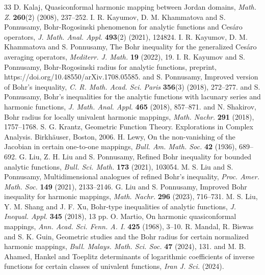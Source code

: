 \documentclass[11pt,reqno]{amsart}
\newtheorem{open problem}{Open problem}[section]
\numberwithin{equation}{section}
\begin{document}
\begin{thebibliography}{33}
 {\sc D. Kalaj}, Quasiconformal harmonic mapping between Jordan domains, {\it Math. Z.} {\bf260}(2) (2008), 237--252.
  {\sc I. R. Kayumov, D. M. Khammatova} and {\sc S. Ponnusamy}, Bohr-Rogosinski phenomenon for analytic functions and Ces\'aro operators, {\it J. Math. Anal. Appl.} {\bf 493}(2) (2021), 124824. 
  {\sc I. R. Kayumov, D. M. Khammatova} and {\sc S. Ponnusamy}, The Bohr inequality for the generalized Ces\'aro averaging operators, {\it Mediterr. J. Math.} {\bf 19} (2022), 19. 
  {\sc I. R. Kayumov} and {\sc S. Ponnusamy}, Bohr-Rogosinski radius for analytic functions, preprint, https://doi.org/10.48550/arXiv.1708.05585.
 and {\sc S. Ponnusamy}, Improved version of Bohr's inequality, {\it C. R. Math. Acad. Sci. Paris} {\bf356}(3) (2018), 272--277.
 and {\sc S. Ponnusamy}, Bohr's inequalities for the analytic functions with lacunary series and harmonic functions, {\it J. Math. Anal. Appl.} {\bf465} (2018), 857--871.
 and {\sc N. Shakirov}, Bohr radius for locally univalent harmonic mappings, {\it Math. Nachr.} {\bf291} (2018), 1757--1768.
 {\sc S. G. Krantz}, Geometric Function Theory. Explorations in Complex Analysis. Birkh\"auser, Boston, 2006.
 {\sc H. Lewy}, On the non-vanishing of the Jacobian in certain one-to-one mappings, {\it Bull. Am. Math. Soc.} {\bf42} (1936), 689--692.
 {\sc G. Liu, Z. H.  Liu} and {\sc S. Ponnusamy}, Refined Bohr inequality for bounded analytic functions, {\it Bull. Sci. Math.} {\bf173} (2021), 103054.
 {\sc M. S. Liu} and {\sc S. Ponnusamy}, Multidimensional analogues of refined Bohr's inequality, {\it Proc. Amer. Math. Soc.} {\bf149} (2021), 2133--2146.
 {\sc G. Liu} and {\sc S. Ponnusamy}, Improved Bohr inequality for harmonic mappings, {\it Math. Nachr.} {\bf296} (2023), 716--731.
 {\sc M. S. Liu, Y. M. Shang} and {\sc J. F. Xu}, Bohr-type inequalities of analytic functions, {\it J. Inequal. Appl.} {\bf345} (2018), 13 pp.
 {\sc O. Martio}, On harmonic quasiconformal mappings, {\it Ann. Acad. Sci. Fenn. A. I.} {\bf425} (1968), 3--10.
 {\sc R. Mandal, R. Biswas} and {\sc S. K. Guin}, Geometric studies and the Bohr radius for certain normalized harmonic mappings, {\it Bull. Malays. Math. Sci. Soc.} {\bf47} (2024), 131.
 and {\sc M. B. Ahamed}, Hankel and Toeplitz determinants of logarithmic coefficients of inverse functions for certain classes of univalent functions, {\it Iran J. Sci.} (2024).

\end{thebibliography}
\end{document}

